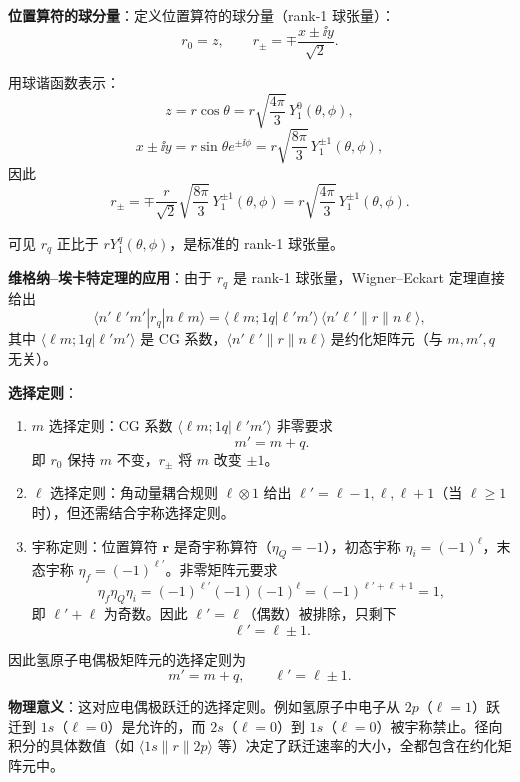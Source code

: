 \begin{solution}
	\textbf{位置算符的球分量}：定义位置算符的球分量（rank-1 球张量）：
	\[
	r_0 = z,\qquad
	r_\pm = \mp\frac{x\pm\ii y}{\sqrt{2}}.
	\]

	用球谐函数表示：
	\[
	z = r\cos\theta = r\sqrt{\frac{4\pi}{3}}\,Y_1^0(\theta,\phi),
	\]
	\[
	x\pm\ii y = r\sin\theta e^{\pm\ii\phi} = r\sqrt{\frac{8\pi}{3}}\,Y_1^{\pm1}(\theta,\phi),
	\]
	因此
	\[
	r_\pm = \mp\frac{r}{\sqrt{2}}\sqrt{\frac{8\pi}{3}}\,Y_1^{\pm1}(\theta,\phi)
	= r\sqrt{\frac{4\pi}{3}}\,Y_1^{\pm1}(\theta,\phi).
	\]

	可见 $r_q$ 正比于 $r Y_1^q(\theta,\phi)$，是标准的 rank-1 球张量。

	\textbf{维格纳--埃卡特定理的应用}：由于 $r_q$ 是 rank-1 球张量，Wigner--Eckart 定理直接给出
	\[
	\langle n'\ell'm'|r_q|n\ell m\rangle
	= \langle \ell m;1q|\ell'm'\rangle\,
	\langle n'\ell'\|r\|n\ell\rangle,
	\]
	其中 $\langle \ell m;1q|\ell'm'\rangle$ 是 CG 系数，$\langle n'\ell'\|r\|n\ell\rangle$ 是约化矩阵元（与 $m,m',q$ 无关）。

	\textbf{选择定则}：
	\begin{enumerate}
	\item $m$ 选择定则：CG 系数 $\langle \ell m;1q|\ell'm'\rangle$ 非零要求
	\[
	m' = m + q.
	\]
	即 $r_0$ 保持 $m$ 不变，$r_\pm$ 将 $m$ 改变 $\pm1$。
	\item $\ell$ 选择定则：角动量耦合规则 $\ell\otimes1$ 给出 $\ell' = \ell-1,\ell,\ell+1$（当 $\ell\ge1$ 时），但还需结合宇称选择定则。
	\item 宇称定则：位置算符 $\mathbf r$ 是奇宇称算符（$\eta_Q=-1$），初态宇称 $\eta_i=(-1)^\ell$，末态宇称 $\eta_f=(-1)^{\ell'}$。非零矩阵元要求
	\[
	\eta_f\eta_Q\eta_i = (-1)^{\ell'}(-1)(-1)^\ell = (-1)^{\ell'+\ell+1} = 1,
	\]
	即 $\ell'+\ell$ 为奇数。因此 $\ell'=\ell$（偶数）被排除，只剩下
	\[
	\ell' = \ell\pm1.
	\]
	\end{enumerate}

	因此氢原子电偶极矩阵元的选择定则为
	\[
	\boxed{m' = m+q,\qquad \ell' = \ell\pm1}.
	\]

	\textbf{物理意义}：这对应电偶极跃迁的选择定则。例如氢原子中电子从 $2p$（$\ell=1$）跃迁到 $1s$（$\ell=0$）是允许的，而 $2s$（$\ell=0$）到 $1s$（$\ell=0$）被宇称禁止。径向积分的具体数值（如 $\langle 1s\|r\|2p\rangle$ 等）决定了跃迁速率的大小，全都包含在约化矩阵元中。
	\end{solution}

